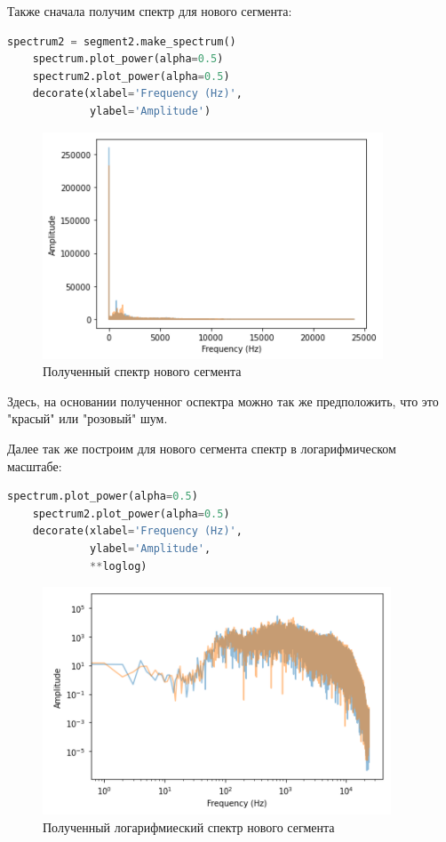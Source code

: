 \documentclass[a4paper]{article}
\begin{document}
            Также сначала получим спектр для нового сегмента:
            
\begin{lstlisting}[language=Python, caption= Получение спектра нового сегмента]
    spectrum2 = segment2.make_spectrum()
    spectrum.plot_power(alpha=0.5)
    spectrum2.plot_power(alpha=0.5)
    decorate(xlabel='Frequency (Hz)',
             ylabel='Amplitude')
\end{lstlisting}               
            
            \begin{figure}[H]
                \centering
                \includegraphics{ex_1_rain_second_spectr.png}
                \caption{Полученный спектр нового сегмента}
                \label{fig:ex_1_rain_spectr}
            \end{figure}
            
            Здесь, на основании полученног оспектра можно так же предположить, что это "красый" или "розовый" шум.
            
            Далее так же построим для нового сегмента спектр в логарифмическом масштабе:
            
\begin{lstlisting}[language=Python, caption= Получение логарифмиеского спектра нового сегмента]
    spectrum.plot_power(alpha=0.5)
    spectrum2.plot_power(alpha=0.5)
    decorate(xlabel='Frequency (Hz)',
             ylabel='Amplitude',
             **loglog)
\end{lstlisting}               
            
            \begin{figure}[H]
                \centering
                \includegraphics{ex_1_rain_second_log_spectr.png}
                \caption{Полученный логарифмиеский спектр нового сегмента}
                \label{fig:ex_1_rain_second_log_spectr}
            \end{figure}
            
\end{document}
